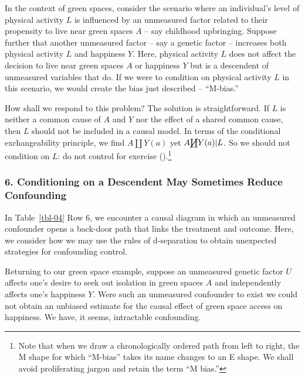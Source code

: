 \documentclass[
  singlecolumn]{article}
\begin{document}
In the context of green spaces, consider the scenario where an
individual's level of physical activity \(L\) is influenced by an
unmeasured factor related to their propensity to live near green spaces
\(A\) -- say childhood upbringing. Suppose further that another
unmeasured factor -- say a genetic factor -- increases both physical
activity \(L\) and happiness \(Y\). Here, physical activity \(L\) does
not affect the decision to live near green spaces \(A\) or happiness
\(Y\) but is a descendent of unmeasured variables that do. If we were to
condition on physical activity \(L\) in this scenario, we would create
the bias just described -- ``M-bias.''

How shall we respond to this problem? The solution is straightforward.
If \(L\) is neither a common cause of \(A\) and \(Y\) nor the effect of
a shared common cause, then \(L\) should not be included in a causal
model. In terms of the conditional exchangeability principle, we find
\(A \coprod Y(a)\) yet \(A \cancel{\coprod} Y(a)| L\). So we should not
condition on \(L\): do not control for exercise
().\footnote{Note that
  when we draw a chronologically ordered path from left to right, the M
  shape for which ``M-bias'' takes its name changes to an E shape. We
  shall avoid proliferating jargon and retain the term ``M bias.''}

\subsubsection{6. Conditioning on a Descendent May Sometimes Reduce
Confounding}\label{conditioning-on-a-descendent-may-sometimes-reduce-confounding}

In Table~\ref{tbl-04} Row 6, we encounter a causal diagram in which an
unmeasured confounder opens a back-door path that links the treatment
and outcome. Here, we consider how we may use the rules of d-separation
to obtain unexpected strategies for confounding control.

Returning to our green space example, suppose an unmeasured genetic
factor \(U\) affects one's desire to seek out isolation in green spaces
\(A\) and independently affects one's happiness \(Y\). Were such an
unmeasured confounder to exist we could not obtain an unbiased estimate
for the causal effect of green space access on happiness. We have, it
seems, intractable confounding.
\end{document}
